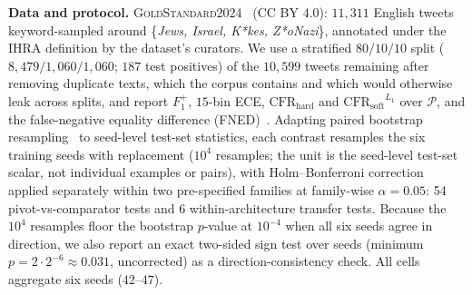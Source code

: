 \documentclass[11pt]{article}
\newcommand{\dataset}{\textsc{GoldStandard2024}\xspace}
\newcommand{\Fpos}{\ensuremath{F_1^{+}}\xspace}
\newcommand{\CFRh}{\ensuremath{\mathrm{CFR}_{\mathrm{hard}}}\xspace}
\newcommand{\CFRs}{\ensuremath{\mathrm{CFR}_{\mathrm{soft}}}\xspace}
\begin{document}
\textbf{Data and protocol.} \dataset{}~\citep{jikeli2024goldstandard} (CC BY 4.0): $11{,}311$ English tweets keyword-sampled around \{\emph{Jews, Israel, K*kes, Z*oNazi}\}, annotated under the IHRA definition by the dataset's curators. We use a stratified $80/10/10$ split ($8{,}479/1{,}060/1{,}060$; $187$ test positives) of the $10{,}599$ tweets remaining after removing duplicate texts, which the corpus contains and which would otherwise leak across splits, and report \Fpos, $15$-bin ECE, \CFRh{} and $\CFRs^{L_1}$ over $\mathcal{P}$, and the false-negative equality difference (FNED)~\citep{dixon2018measuring}.
Adapting paired bootstrap resampling~\citep{dror2018hitchhikers} to seed-level test-set statistics, each contrast resamples the six training seeds with replacement ($10^4$ resamples; the unit is the seed-level test-set scalar, not individual examples or pairs), with Holm--Bonferroni correction applied separately within two pre-specified families at family-wise $\alpha{=}0.05$: 54 pivot-vs-comparator tests and 6 within-architecture transfer tests. Because the $10^4$ resamples floor the bootstrap $p$-value at $10^{-4}$ when all six seeds agree in direction, we also report an exact two-sided sign test over seeds (minimum $p = 2\cdot 2^{-6} \approx 0.031$, uncorrected) as a direction-consistency check. All cells aggregate six seeds ($42$--$47$).
\end{document}
